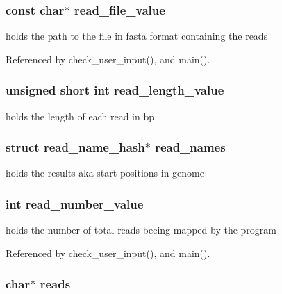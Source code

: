 \subsubsection[{read\_\-file\_\-value}]{\setlength{\rightskip}{0pt plus 5cm}const char$\ast$ {\bf read\_\-file\_\-value}}\label{saruman_8h_7e0ebff9d0ff905d5fba75c60367c542}


holds the path to the file in fasta format containing the reads 

Referenced by check\_\-user\_\-input(), and main().
\subsubsection[{read\_\-length\_\-value}]{\setlength{\rightskip}{0pt plus 5cm}unsigned short int {\bf read\_\-length\_\-value}}\label{saruman_8h_479a7d2a7ccfd26746c3831ea1d46afe}


holds the length of each read in bp 
\subsubsection[{read\_\-names}]{\setlength{\rightskip}{0pt plus 5cm}struct {\bf read\_\-name\_\-hash}$\ast$ {\bf read\_\-names}}\label{saruman_8h_0aa4bc36df5f7c54e3b8663dfd3b40ca}


holds the results aka start positions in genome 
\subsubsection[{read\_\-number\_\-value}]{\setlength{\rightskip}{0pt plus 5cm}int {\bf read\_\-number\_\-value}}\label{saruman_8h_39784325be5139d2f724b4c8574fd8ad}


holds the number of total reads beeing mapped by the program 

Referenced by check\_\-user\_\-input(), and main().
\subsubsection[{reads}]{\setlength{\rightskip}{0pt plus 5cm}char$\ast$ {\bf reads}}\label{saruman_8h_b223bee0f0147d30d97bc6e330554830}




